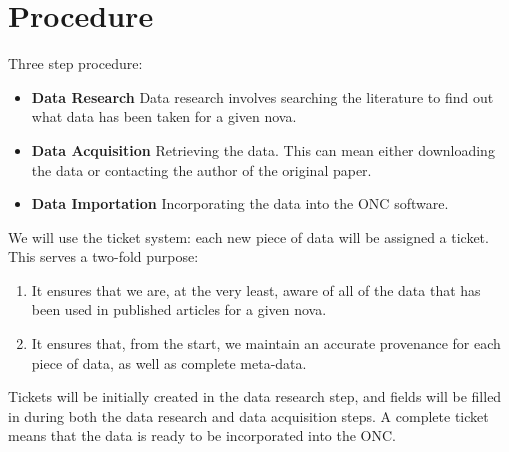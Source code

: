 \documentclass{article}
\begin{document}
%


\section{Procedure}
Three step procedure:
\begin{itemize}
\item \textbf{Data Research} Data research involves searching the literature to find out what data has been taken for a given nova.
\item \textbf{Data Acquisition} Retrieving the data. This can mean either downloading the data or contacting the author of the original paper.
\item \textbf{Data Importation} Incorporating the data into the ONC software.
\end{itemize}



We will use the ticket system: each new piece of data will be assigned a ticket. This serves a two-fold purpose: 
\begin{enumerate}
\item  It ensures that we are, at the very least, aware of all of the data that has been used in published articles for a given nova.
\item It ensures that, from the start, we maintain an accurate provenance for each piece of data, as well as complete meta-data.
\end{enumerate}

Tickets will be initially created in the data research step, and fields will be filled in during both the data research and data acquisition steps. A complete ticket means that the data is ready to be incorporated into the ONC.
\end{document}
